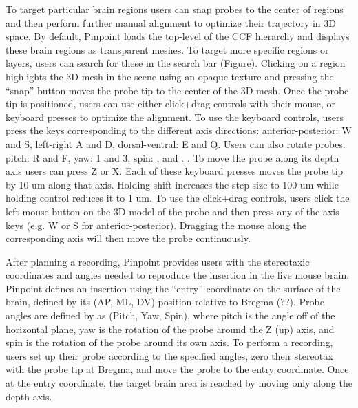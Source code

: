 To target particular brain regions users can snap probes to the center of regions and then perform further manual alignment to optimize their trajectory in 3D space. By default, Pinpoint loads the top-level of the CCF hierarchy and displays these brain regions as transparent meshes. To target more specific regions or layers, users can search for these in the search bar (Figure). Clicking on a region highlights the 3D mesh in the scene using an opaque texture and pressing the ``snap'' button moves the probe tip to the center of the 3D mesh. Once the probe tip is positioned, users can use either click+drag controls with their mouse, or keyboard presses to optimize the alignment. To use the keyboard controls, users press the keys corresponding to the different axis directions: anterior-posterior: W and S, left-right A and D, dorsal-ventral: E and Q. Users can also rotate probes: pitch: R and F, yaw: 1 and 3, spin: , and . . To move the probe along its depth axis users can press Z or X. Each of these keyboard presses moves the probe tip by 10 um along that axis. Holding shift increases the step size to 100 um while holding control reduces it to 1 um. To use the click+drag controls, users click the left mouse button on the 3D model of the probe and then press any of the axis keys (e.g. W or S for anterior-posterior). Dragging the mouse along the corresponding axis will then move the probe continuously.

After planning a recording, Pinpoint provides users with the stereotaxic coordinates and angles needed to reproduce the insertion in the live mouse brain. Pinpoint defines an insertion using the ``entry'' coordinate on the surface of the brain, defined by its (AP, ML, DV) position relative to Bregma (??). Probe angles are defined by as (Pitch, Yaw, Spin), where pitch is the angle off of the horizontal plane, yaw is the rotation of the probe around the Z (up) axis, and spin is the rotation of the probe around its own axis. To perform a recording, users set up their probe according to the specified angles, zero their stereotax with the probe tip at Bregma, and move the probe to the entry coordinate. Once at the entry coordinate, the target brain area is reached by moving only along the depth axis.


